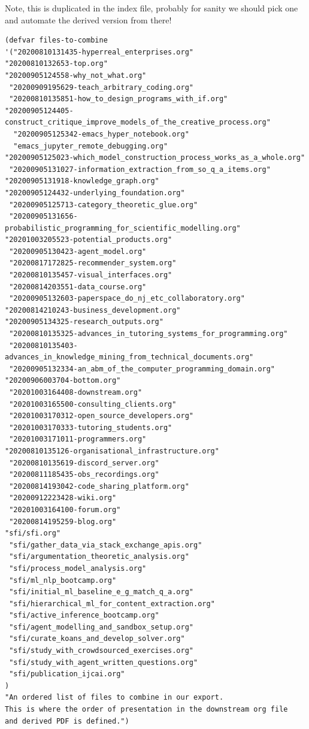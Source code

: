\documentclass[11pt]{article}
\begin{document}
Note, this is duplicated in the index file, probably for sanity we
should pick one and automate the derived version from there!

\begin{verbatim}
(defvar files-to-combine
'("20200810131435-hyperreal_enterprises.org"
"20200810132653-top.org"
"20200905124558-why_not_what.org"
 "20200909195629-teach_arbitrary_coding.org"
 "20200810135851-how_to_design_programs_with_if.org"
"20200905124405-construct_critique_improve_models_of_the_creative_process.org"
  "20200905125342-emacs_hyper_notebook.org"
  "emacs_jupyter_remote_debugging.org"
"20200905125023-which_model_construction_process_works_as_a_whole.org"
 "20200905131027-information_extraction_from_so_q_a_items.org"
"20200905131918-knowledge_graph.org"
"20200905124432-underlying_foundation.org"
 "20200905125713-category_theoretic_glue.org"
 "20200905131656-probabilistic_programming_for_scientific_modelling.org"
"20201003205523-potential_products.org"
 "20200905130423-agent_model.org"
 "20200817172825-recommender_system.org"
 "20200810135457-visual_interfaces.org"
 "20200814203551-data_course.org"
 "20200905132603-paperspace_do_nj_etc_collaboratory.org"
"20200814210243-business_development.org"
"20200905134325-research_outputs.org"
 "20200810135325-advances_in_tutoring_systems_for_programming.org"
 "20200810135403-advances_in_knowledge_mining_from_technical_documents.org"
 "20200905132334-an_abm_of_the_computer_programming_domain.org"
"20200906003704-bottom.org"
 "20201003164408-downstream.org"
 "20201003165500-consulting_clients.org"
 "20201003170312-open_source_developers.org"
 "20201003170333-tutoring_students.org"
 "20201003171011-programmers.org"
"20200810135126-organisational_infrastructure.org"
 "20200810135619-discord_server.org"
 "20200811185435-obs_recordings.org"
 "20200814193042-code_sharing_platform.org"
 "20200912223428-wiki.org"
 "20201003164100-forum.org"
 "20200814195259-blog.org"
"sfi/sfi.org"
 "sfi/gather_data_via_stack_exchange_apis.org"
 "sfi/argumentation_theoretic_analysis.org"
 "sfi/process_model_analysis.org"
 "sfi/ml_nlp_bootcamp.org"
 "sfi/initial_ml_baseline_e_g_match_q_a.org"
 "sfi/hierarchical_ml_for_content_extraction.org"
 "sfi/active_inference_bootcamp.org"
 "sfi/agent_modelling_and_sandbox_setup.org"
 "sfi/curate_koans_and_develop_solver.org"
 "sfi/study_with_crowdsourced_exercises.org"
 "sfi/study_with_agent_written_questions.org"
 "sfi/publication_ijcai.org"
)
"An ordered list of files to combine in our export.
This is where the order of presentation in the downstream org file
and derived PDF is defined.")
\end{verbatim}
\end{document}
